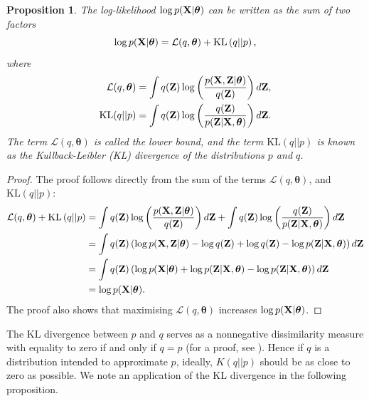 \documentclass[12pt, oneside]{book}
\numberwithin{equation}{section}
\newcommand{\KL}[2]{\text{KL}\left(#1 \vert\vert #2\right)}
\newtheorem{proposition}{Proposition}[section]
\begin{document}
{\begin{proposition} \label{prop:log-likelihood-partition}
	The log-likelihood $\log p({\bf X} \vert \boldsymbol{\theta})$ can be written as the sum of two factors
	\begin{equation}
		\log p({\bf X} \vert \boldsymbol{\theta}) = \mathcal{L}(q, \boldsymbol{\theta}) +\KL{q}{p},
	\end{equation}
	where
	\begin{align}
		\mathcal{L}(q, \boldsymbol{\theta}) &= \int q({\bf Z})\log\left(\frac{p({\bf X}, {\bf Z} \vert \boldsymbol\theta)}{q({\bf Z})}\right) d{\bf Z},\\
		\text{KL}(q \vert\vert p) &= \int q({\bf Z}) \log\left(\frac{q({\bf Z})}{p({\bf Z}\vert {\bf X}, \boldsymbol\theta)}\right) d{\bf Z}.
	\end{align}
	The term $\mathcal{L}(q, \boldsymbol\theta)$ is called the lower bound, and the term $\KL{q}{p}$ is known as the Kullback-Leibler (KL) divergence of the distributions $p$ and $q$.
\end{proposition}

\begin{proof}
	The proof follows directly from the sum of the terms $\mathcal{L}(q, \boldsymbol{\theta})$, and  $\text{KL}(q \vert\vert p)$:
	\begin{align}
		\mathcal{L}(q, \boldsymbol{\theta}) + \KL{q}{p} &= \int q({\bf Z})\log\left(\frac{p({\bf X}, {\bf Z} \vert \boldsymbol\theta)}{q({\bf Z})}\right) d{\bf Z} + \int q({\bf Z}) \log\left(\frac{q({\bf Z})}{p({\bf Z}\vert {\bf X}, \boldsymbol\theta)}\right) d{\bf Z}\\
		&= \int q({\bf Z})\left(\log p({\bf X, {\bf Z} \vert \boldsymbol{\theta}}) - \log q({\bf Z}) + \log q({\bf Z}) - \log p({\bf Z} \vert {\bf X}, \boldsymbol\theta)\right) d{\bf Z}\\
		&= \int q({\bf Z})\left(\log p({\bf X} \vert \boldsymbol{\theta}) + \log p({\bf Z} \vert {\bf X}, \boldsymbol{\theta}) - \log p({\bf Z} \vert {\bf X}, \boldsymbol\theta)\right) d{\bf Z}\\
		&= \log p({\bf X}\vert \boldsymbol\theta).
	\end{align}
	The proof also shows that maximising $\mathcal{L}(q, \boldsymbol\theta)$ increases $\log p({\bf X}\vert \boldsymbol\theta)$.
\end{proof}

The KL divergence between $p$ and $q$ serves as a nonnegative dissimilarity measure with equality to zero if and only if $q=p$  (for a proof, see \cite{pml1Book}). Hence if $q$ is a distribution intended to approximate $p$, ideally, $K(q \vert \vert p)$ should be as close to zero as possible. We note an application of the KL divergence in the following proposition.

}
\end{document}

